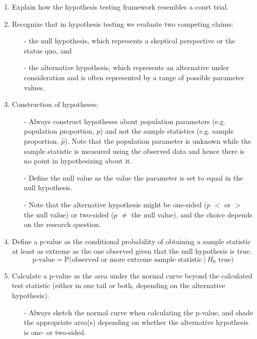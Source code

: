 \documentclass[11pt]{article}
\begin{document}
\begin{enumerate}[resume]
\renewcommand\labelenumi{\textcolor{light}{\textbf{LO \theenumi.}}}

\item Explain how the hypothesis testing framework resembles a court trial.

\item Recognize that in hypothesis testing we evaluate two competing claims: 
\begin{itemize}
\item[-] the null hypothesis, which represents a skeptical perspective or the status quo, and 
\item[-] the alternative hypothesis, which represents an alternative under consideration and is often represented by a range of possible parameter values.
\end{itemize}

\item Construction of hypotheses:
\begin{itemize}
\item[-] Always construct hypotheses about population parameters (e.g. population proportion, $p$) and not the sample statistics (e.g. sample proportion, $\hat{p}$). Note that the population parameter is unknown while the sample statistic is measured using the observed data and hence there is no point in hypothesizing about it.
\item[-] Define the null value as the value the parameter is set to equal in the null hypothesis.
\item[-] Note that the alternative hypothesis might be one-sided ($p$ $<$ or $>$ the null value) or two-sided ($p$ $\ne$ the null value), and the choice depends on the research question.
\end{itemize}

\item Define a p-value as the conditional probability of obtaining a sample statistic at least as extreme as the one observed given that the null hypothesis is true.
\[ \text{p-value} = \text{P(observed or more extreme sample statistic}~|~H_0 \text{ true)} \]

\item Calculate a p-value as the area under the normal curve beyond the calculated test statistic (either in one tail or both, depending on the alternative hypothesis). %
\begin{itemize}
\item[-] Always sketch the normal curve when calculating the p-value, and shade the appropriate area(s) depending on whether the alternative hypothesis is one- or two-sided.
\end{itemize}


\end{enumerate}
\end{document}
